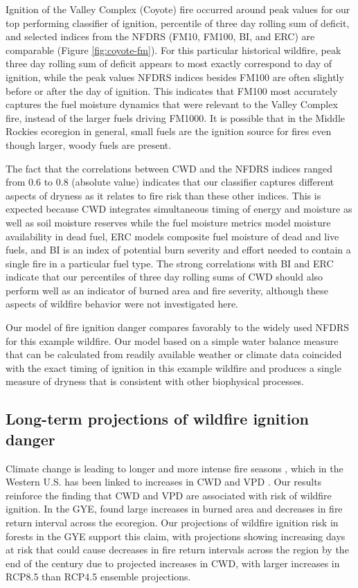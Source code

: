 \documentclass[11p]{article}
\begin{document}
Ignition of the Valley Complex (Coyote) fire occurred around peak values for our top performing classifier of ignition, percentile of three day rolling sum of deficit, and selected indices from the NFDRS (FM10, FM100, BI, and ERC) are comparable (Figure \ref{fig:coyote-fm}). For this particular historical wildfire, peak three day rolling sum of deficit appears to most exactly correspond to day of ignition, while the peak values NFDRS indices besides FM100 are often slightly before or after the day of ignition. This indicates that FM100 most accurately captures the fuel moisture dynamics that were relevant to the Valley Complex fire, instead of the larger fuels driving FM1000. It is possible that in the Middle Rockies ecoregion in general, small fuels are the ignition source for fires even though larger, woody fuels are present.

The fact that the correlations between CWD and the NFDRS indices ranged from 0.6 to 0.8 (absolute value) indicates that our classifier captures different aspects of dryness as it relates to fire risk than these other indices. This is expected because CWD integrates simultaneous timing of energy and moisture as well as soil moisture reserves while the fuel moisture metrics model moisture availability in dead fuel, ERC models composite fuel moisture of dead and live fuels, and BI is an index of potential burn severity and effort needed to contain a single fire in a particular fuel type. The strong correlations with BI and ERC indicate that our percentiles of three day rolling sums of CWD should also perform well as an indicator of burned area and fire severity, although these aspects of wildfire behavior were not investigated here. 

Our model of fire ignition danger compares favorably to the widely used NFDRS for this example wildfire. Our model based on a simple water balance measure that can be calculated from readily available weather or climate data coincided with the exact timing of ignition in this example wildfire and produces a single measure of dryness that is consistent with other biophysical processes.

\subsection{Long-term projections of wildfire ignition danger}

Climate change is leading to longer and more intense fire seasons \citep{abatzoglouProjectedIncreasesWestern2021,littellReviewRelationshipsDrought2016,jollyClimateinducedVariationsGlobal2015}, which in the Western U.S. has been linked to increases in CWD and VPD \citep{abatzoglouImpactAnthropogenicClimate2016}. Our results reinforce the finding that CWD and VPD are associated with risk of wildfire ignition. In the GYE, \citet{westerlingContinuedWarmingCould2011} found large increases in burned area and decreases in fire return interval across the ecoregion. Our projections of wildfire ignition risk in forests in the GYE support this claim, with projections showing increasing days at risk that could cause decreases in fire return intervals across the region by the end of the century due to projected increases in CWD, with larger increases in RCP8.5 than RCP4.5 ensemble projections.
\end{document}
